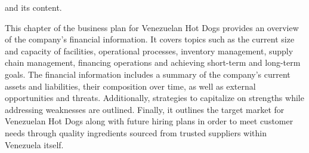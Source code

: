  and its content. 

This chapter of the business plan for Venezuelan Hot Dogs provides an overview of the company's financial information. It covers topics such as the current size and capacity of facilities, operational processes, inventory management, supply chain management, financing operations and achieving short-term and long-term goals. The financial information includes a summary of the company's current assets and liabilities, their composition over time, as well as external opportunities and threats. Additionally, strategies to capitalize on strengths while addressing weaknesses are outlined. Finally, it outlines the target market for Venezuelan Hot Dogs along with future hiring plans in order to meet customer needs through quality ingredients sourced from trusted suppliers within Venezuela itself.